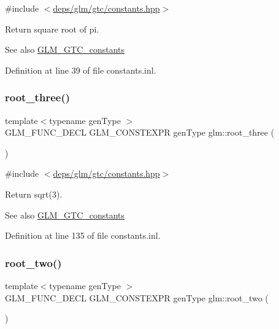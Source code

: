 {\ttfamily \#include $<$\hyperlink{constants_8hpp}{deps/glm/gtc/constants.\+hpp}$>$}

Return square root of pi. \begin{DoxySeeAlso}{See also}
\hyperlink{group__gtc__constants}{G\+L\+M\+\_\+\+G\+T\+C\+\_\+constants} 
\end{DoxySeeAlso}


Definition at line 39 of file constants.\+inl.

\mbox{\label{group__gtc__constants_ga4f286be4abe88be1eed7d2a9f6cb193e}} 
\subsubsection{\texorpdfstring{root\+\_\+three()}{root\_three()}}
{\footnotesize\ttfamily template$<$typename gen\+Type $>$ \\
G\+L\+M\+\_\+\+F\+U\+N\+C\+\_\+\+D\+E\+CL G\+L\+M\+\_\+\+C\+O\+N\+S\+T\+E\+X\+PR gen\+Type glm\+::root\+\_\+three (\begin{DoxyParamCaption}{ }\end{DoxyParamCaption})}



{\ttfamily \#include $<$\hyperlink{constants_8hpp}{deps/glm/gtc/constants.\+hpp}$>$}

Return sqrt(3). \begin{DoxySeeAlso}{See also}
\hyperlink{group__gtc__constants}{G\+L\+M\+\_\+\+G\+T\+C\+\_\+constants} 
\end{DoxySeeAlso}


Definition at line 135 of file constants.\+inl.

\mbox{\label{group__gtc__constants_ga74e607d29020f100c0d0dc46ce2ca950}} 
\subsubsection{\texorpdfstring{root\+\_\+two()}{root\_two()}}
{\footnotesize\ttfamily template$<$typename gen\+Type $>$ \\
G\+L\+M\+\_\+\+F\+U\+N\+C\+\_\+\+D\+E\+CL G\+L\+M\+\_\+\+C\+O\+N\+S\+T\+E\+X\+PR gen\+Type glm\+::root\+\_\+two (\begin{DoxyParamCaption}{ }\end{DoxyParamCaption})}



